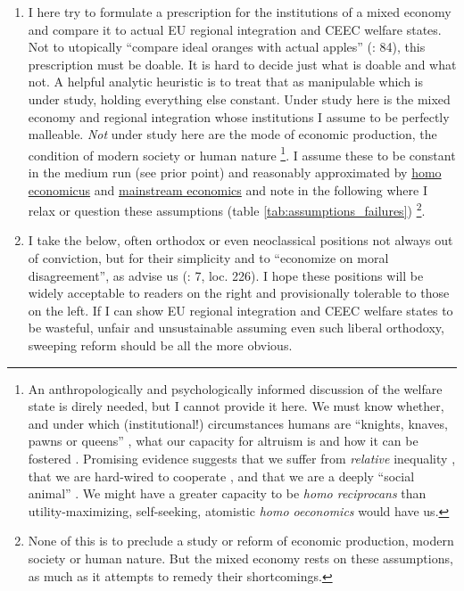 \documentclass[11pt,a4paper,oneside,openright]{article}
\begin{document}
\begin{enumerate}
\begin{enumerate}
		\item I here try to formulate a prescription for the institutions of a mixed economy and compare it to actual \gls{EU} regional integration and \gls{CEEC} welfare states. 
		Not to utopically ``compare ideal oranges with actual apples'' (\citealt{Dahl-1989-aa}: 84), this prescription must be doable. 
		It is hard to decide just what is doable and what not. 
		A helpful analytic heuristic is to treat that as manipulable which is under study, holding everything else constant. 
		Under study here is the mixed economy and regional integration whose institutions I assume to be perfectly malleable. 
		\emph{Not} under study here are the mode of economic production, the condition of modern society or human nature
			\footnote{
				An anthropologically and psychologically informed discussion of the welfare state is direly needed, but I cannot provide it here. 
				We must know whether, and under which (institutional!) circumstances humans are ``knights, knaves, pawns or queens'' \citep{LeGrand2003}, what our capacity for altruism is \citep{Henrich2007} and how it can be fostered \citep{Axelrod1981a}. 
				Promising evidence suggests that we suffer from \emph{relative} inequality \citep{Pickett-2009-kx}, that we are hard-wired to cooperate \citep{Zak2011}, and that we are a deeply ``social animal'' \citep{Brooks2011}. 
				We might have a greater capacity to be \emph{homo reciprocans} than utility-maximizing, self-seeking, atomistic \emph{homo oeconomics} would have us.
			}.
		I assume these to be constant in the medium run (see prior point) and reasonably approximated by \hyperref[it:homo_economicus]{homo economicus} and \hyperref[sec:perfect_competition]{mainstream economics} and note in the following where I relax or question these assumptions (table \ref{tab:assumptions_failures})
		\footnote{
			None of this is to preclude a study or reform of economic production, modern society or human nature. 
			But the mixed economy rests on these assumptions, as much as it attempts to remedy their shortcomings.
		}. 
		
		\item {} \label{it:economize_moral} I take the below, often orthodox or even neoclassical positions not always out of conviction, but for their simplicity and to ``economize on moral disagreement'', as \citeauthor{GutmannThompson-2004-aa} advise us (\citeyear{GutmannThompson-2004-aa}: 7,  loc. 226). 
		I hope these positions will be widely acceptable to readers on the right and provisionally tolerable to those on the left. 
		If I can show \gls{EU} regional integration and \gls{CEEC} welfare states to be wasteful, unfair and unsustainable assuming even such liberal orthodoxy, sweeping reform should be all the more obvious.
		
		
	\end{enumerate}
\end{enumerate}
\end{document}
